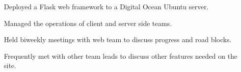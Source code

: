 \documentclass[letterpaper]{deedy-resume} %
\begin{document}
\begin{minipage}[t]{0.66\textwidth}

\begin{tightitemize}
\item Deployed a Flask web framework to a Digital Ocean Ubuntu server.
\item Managed the operations of client and server side teams.
\item Held biweekly meetings with web team to discuss progress and road blocks.
\item Frequently met with other team leads to discuss other features needed on the site.
\end{tightitemize}





\sectionspace %






\end{minipage}
\end{document}
